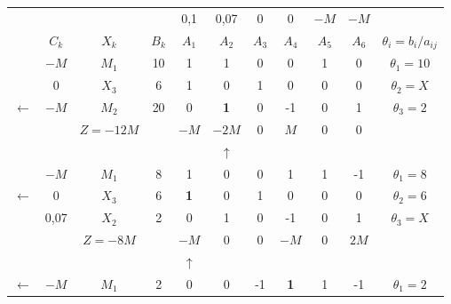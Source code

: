     \begin{tabular}{ccccccccccc}
\cline{2-11}            &         &         &         & 0,1     & 0,07    & 0       & 0       & $-M$    & $-M$    &  \bigstrut[t]\\
            & $C_k$   & $X_k$   & $B_k$   & $A_1$   & $A_2$   & $A_3$   & $A_4$   & $A_5$   & $A_6$   & $\theta_i = b_i/a_{ij}$ \bigstrut[b]\\
\cline{2-11}            & $-M$    & $M_1$   & 10      & 1       & 1       & 0       & 0       & 1       & 0       & $\theta_1 = 10$ \bigstrut[t]\\
            & 0       & $X_3$   & 6       & 1       & 0       & 1       & 0       & 0       & 0       & $\theta_2 = X$ \\
    $\leftarrow$ & $-M$    & \textcolor[rgb]{ 1,  0,  0}{\boldmath{}\textbf{$M_2$}\unboldmath{}} & 20      & 0       & \textbf{1} & 0       & -1      & 0       & 1       & \boldmath{}\textbf{$\theta_3 =2$}\unboldmath{} \bigstrut[b]\\
\cline{2-11}            &         & $Z=-12M$ &         & $-M$    & \textcolor[rgb]{ 0,  .439,  .753}{\boldmath{}\textbf{$-2M$}\unboldmath{}} & 0       & $M$     & 0       & 0       &  \bigstrut\\
\cline{2-11}            &         &         &         &         & $\uparrow$ &         &         &         &         &  \bigstrut\\
\cline{2-11}            & $-M$    & $M_1$   & 8       & 1       & 0       & 0       & 1       & 1       & -1      & $\theta_1 =8$ \bigstrut[t]\\
    $\leftarrow$ & 0       & \textcolor[rgb]{ 1,  0,  0}{\boldmath{}\textbf{$X_3$}\unboldmath{}} & 6       & \textbf{1} & 0       & 1       & 0       & 0       & 0       & \boldmath{}\textbf{$\theta_2 = 6$}\unboldmath{} \\
            & 0,07    & $X_2$   & 2       & 0       & 1       & 0       & -1      & 0       & 1       & $\theta_3 = X$ \bigstrut[b]\\
\cline{2-11}            &         & $Z=-8M$ &         & \textcolor[rgb]{ 0,  .439,  .753}{\boldmath{}\textbf{$-M$}\unboldmath{}} & 0       & 0       & $-M$    & 0       & $2M$    &  \bigstrut\\
\cline{2-11}            &         &         &         & $\uparrow$ &         &         &         &         &         &  \bigstrut\\
\cline{2-11}    $\leftarrow$ & $-M$    & \textcolor[rgb]{ 1,  0,  0}{\boldmath{}\textbf{$M_1$}\unboldmath{}} & 2       & 0       & 0       & -1      & \textbf{1} & 1       & -1      & \boldmath{}\textbf{$\theta_1 = 2$}\unboldmath{} \bigstrut[t]\\

\end{tabular}
